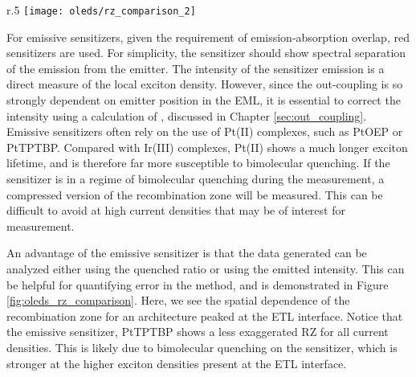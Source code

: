 \documentclass[../thesis.tex]{subfiles}
\begin{document}
\begin{wrapfigure}{r}{.5\textwidth}
\texttt{[image: oleds/rz\_comparison\_2]}
\caption{(Top) Device Architecture.  (Bottom) Recombination zone comparison for an emissive sensitizer analyzed using the quenched ratio (Irppy) and the emitted ratio (PtTPTBP) as a function of current density.}
\label{fig:oleds_rz_comparison}
\end{wrapfigure}

For emissive sensitizers, given the requirement of emission-absorption overlap, red sensitizers are used.
For simplicity, the sensitizer should show spectral separation of the emission from the emitter.
The intensity of the sensitizer emission is a direct measure of the local exciton density.
However, since the out-coupling is so strongly dependent on emitter position in the EML, it is essential to correct the intensity using a calculation of \oc, discussed in Chapter \ref{sec:out_coupling}.
Emissive sensitizers often rely on the use of Pt(II) complexes, such as PtOEP or PtTPTBP.\supercite{Coburn2016a,Hershey2017}
Compared with Ir(III) complexes, Pt(II) shows a much longer exciton lifetime, and is therefore far more susceptible to bimolecular quenching.\supercite{Mezyk2005}
If the sensitizer is in a regime of bimolecular quenching during the measurement, a compressed version of the recombination zone will be measured.
This can be difficult to avoid at high current densities that may be of interest for measurement.


An advantage of the emissive sensitizer is that the data generated can be analyzed either using the quenched ratio or using the emitted intensity.
This can be helpful for quantifying error in the method, and is demonstrated in Figure \ref{fig:oleds_rz_comparison}.
Here, we see the spatial dependence of the recombination zone for an architecture peaked at the ETL interface.
Notice that the emissive sensitizer, PtTPTBP shows a less exaggerated RZ for all current densities.  
This is likely due to bimolecular quenching on the sensitizer, which is stronger at the higher exciton densities present at the ETL interface.
\end{document}
